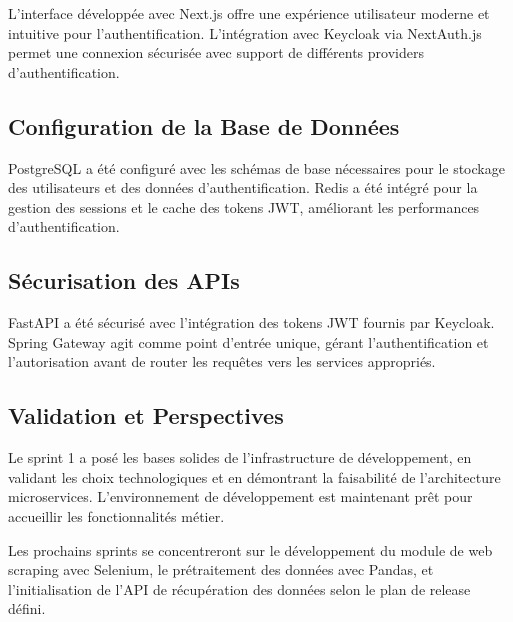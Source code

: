 L'interface développée avec Next.js offre une expérience utilisateur moderne et intuitive pour l'authentification. L'intégration avec Keycloak via NextAuth.js permet une connexion sécurisée avec support de différents providers d'authentification.

\subsection{Configuration de la Base de Données}

PostgreSQL a été configuré avec les schémas de base nécessaires pour le stockage des utilisateurs et des données d'authentification. Redis a été intégré pour la gestion des sessions et le cache des tokens JWT, améliorant les performances d'authentification.

\subsection{Sécurisation des APIs}

FastAPI a été sécurisé avec l'intégration des tokens JWT fournis par Keycloak. Spring Gateway agit comme point d'entrée unique, gérant l'authentification et l'autorisation avant de router les requêtes vers les services appropriés.

\subsection{Validation et Perspectives}

Le sprint 1 a posé les bases solides de l'infrastructure de développement, en validant les choix technologiques et en démontrant la faisabilité de l'architecture microservices. L'environnement de développement est maintenant prêt pour accueillir les fonctionnalités métier.

Les prochains sprints se concentreront sur le développement du module de web scraping avec Selenium, le prétraitement des données avec Pandas, et l'initialisation de l'API de récupération des données selon le plan de release défini.